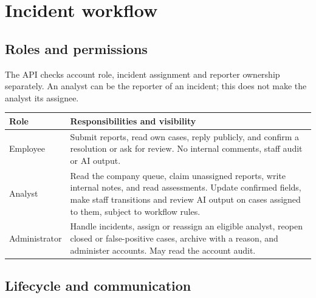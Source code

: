 \documentclass[11pt,a4paper]{article}
\begin{document}
\section{Incident workflow}

\subsection{Roles and permissions}

The API checks account role, incident assignment and reporter ownership
separately. An analyst can be the reporter of an incident; this does not make
the analyst its assignee.

\begin{center}
\begin{tabularx}{\linewidth}{@{}lY@{}}
\toprule
\textbf{Role} & \textbf{Responsibilities and visibility} \\
\midrule
Employee & Submit reports, read own cases, reply publicly, and confirm a
resolution or ask for review. No internal comments, staff audit or AI output. \\
\addlinespace
Analyst & Read the company queue, claim unassigned reports, write internal
notes, and read assessments. Update confirmed fields, make staff transitions
and review AI output on cases assigned to them, subject to workflow rules. \\
\addlinespace
Administrator & Handle incidents, assign or reassign an eligible analyst,
reopen closed or false-positive cases, archive with a reason, and administer
accounts. May read the account audit. \\
\bottomrule
\end{tabularx}
\end{center}

\subsection{Lifecycle and communication}
\end{document}
